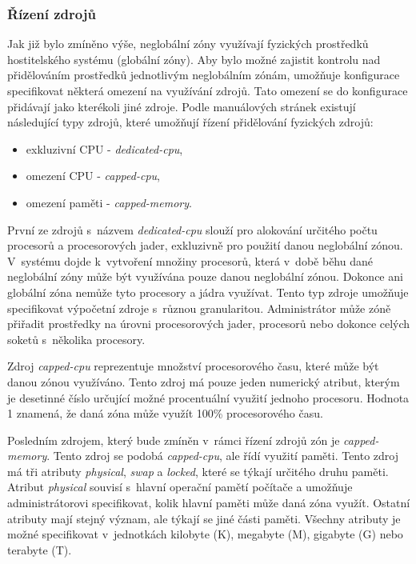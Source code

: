 \subsubsection{Řízení zdrojů}
\label{chapter:zones:configuration:resources:resource_control}
Jak již bylo zmíněno výše, neglobální zóny využívají fyzických prostředků hostitelského systému (globální zóny). Aby bylo
možné zajistit kontrolu nad přidělováním prostředků jednotlivým neglobálním zónám, umožňuje konfigurace specifikovat některá
omezení na využívání zdrojů. Tato omezení se do konfigurace přidávají jako kterékoli jiné zdroje. Podle manuálových stránek
\cite{oracle:manpages:zonecfg} existují následující typy zdrojů, které umožňují řízení přidělování fyzických zdrojů:
\begin{itemize}
 \item exkluzivní CPU - \textit{dedicated-cpu},
 \item omezení CPU - \textit{capped-cpu},
 \item omezení paměti - \textit{capped-memory}.
\end{itemize}
První ze zdrojů s~názvem \textit{dedicated-cpu} slouží pro alokování určitého počtu procesorů a procesorových jader, exkluzivně
pro použití danou neglobální zónou. V~systému dojde k~vytvoření množiny procesorů, která v~době běhu dané neglobální zóny
může být využívána pouze danou neglobální zónou. Dokonce ani globální zóna nemůže tyto procesory a jádra využívat. Tento typ
zdroje umožňuje specifikovat výpočetní zdroje s~různou granularitou. Administrátor může zóně přiřadit prostředky na úrovni 
procesorových jader, procesorů nebo dokonce celých soketů s~několika procesory.

Zdroj \textit{capped-cpu} reprezentuje množství procesorového času, které může být danou zónou využíváno. Tento zdroj má pouze
jeden numerický atribut, kterým je desetinné číslo určující možné procentuální využití jednoho procesoru. Hodnota 1 znamená,
že daná zóna může využít 100\% procesorového času.

Posledním zdrojem, který bude zmíněn v~rámci řízení zdrojů zón je \textit{capped-memory}. Tento zdroj se podobá \textit{capped-cpu},
ale řídí využití paměti. Tento zdroj má tři atributy \textit{physical}, \textit{swap} a \textit{locked}, které se týkají určitého
druhu paměti. Atribut \textit{physical} souvisí s~hlavní operační pamětí počítače a umožňuje administrátorovi specifikovat,
kolik hlavní paměti může daná zóna využít. Ostatní atributy mají stejný význam, ale týkají se jiné části paměti. Všechny 
atributy je možné specifikovat v~jednotkách kilobyte (K), megabyte (M), gigabyte (G) nebo terabyte (T).
